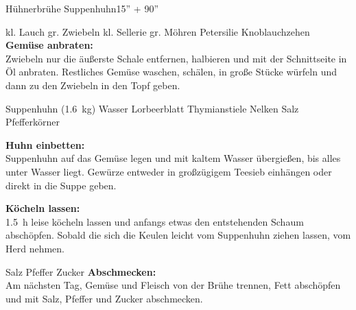 \begin{MyRecipe}{Hühnerbrühe}{ Suppenhuhn}{15'' + 90''}

\ingredient[\Calc{1}{\x}]{} {kl. Lauch}
\ingredient[\Calc{2}{\x}]{} {gr. Zwiebeln}
\ingredient[\Calc{1}{\x}]{} {kl. Sellerie}
\ingredient[\Calc{3}{\x}]{} {gr. Möhren}
 {Petersilie}
\ingredient[\Calc{2}{\x}]{} {Knoblauchzehen}
\textbf{Gemüse anbraten:}\\
Zwiebeln nur die äußerste Schale entfernen, halbieren und mit der Schnittseite in Öl anbraten. Restliches Gemüse waschen, schälen, in große Stücke würfeln und dann zu den Zwiebeln in den Topf geben.

\ingredient[\Calc{1}{\x}]{} {Suppenhuhn (\SI{1,6}{\kilogram})}
 {Wasser}
\ingredient[\Calc{2}{\x}]{} {Lorbeerblatt}
\ingredient[\Calc{4}{\x}]{} {Thymianstiele}
\ingredient[\Calc{2}{\x}]{} {Nelken}
 {Salz}
 {Pfefferkörner}

\textbf{Huhn einbetten:}\\
Suppenhuhn auf das Gemüse legen und mit kaltem Wasser übergießen, bis alles unter Wasser liegt. Gewürze entweder in großzügigem Teesieb einhängen oder direkt in die Suppe geben.

\textbf{Köcheln lassen:}\\
\SI{1,5}{\hour} leise köcheln lassen und anfangs etwas den entstehenden Schaum abschöpfen. Sobald die sich die Keulen leicht vom Suppenhuhn ziehen lassen, vom Herd nehmen.\par

\ingredient[]{} {Salz}
\ingredient[]{} {Pfeffer}
\ingredient[]{} {Zucker}
\textbf{Abschmecken:}\\
Am nächsten Tag, Gemüse und Fleisch von der Brühe trennen, Fett abschöpfen und mit Salz, Pfeffer und Zucker abschmecken.









\end{MyRecipe}